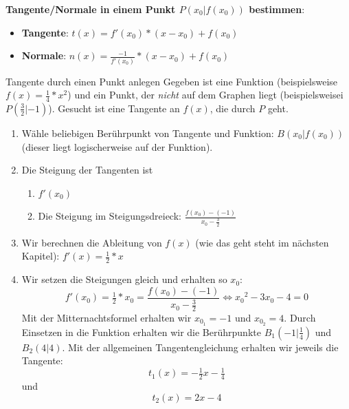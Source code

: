 \begin{koch}
  \textbf{Tangente/Normale in einem Punkt $P(x_0|f(x_0))$ bestimmen}: \\
  \begin{itemize}
    \item \textbf{Tangente}: $t(x)=f'(x_0)*(x-x_0)+f(x_0)$
    \item \textbf{Normale}: $n(x)=\frac{-1}{f'(x_0)}*(x-x_0)+f(x_0)$
  \end{itemize}
\end{koch}



\begin{bla}{Tangente durch einen Punkt anlegen}
  Gegeben ist eine Funktion (beispielsweise $f(x)=\tfrac{1}{4}*x^2$) und ein Punkt, der \emph{nicht} auf dem Graphen liegt (beispielsweisei $P(\tfrac{3}{2}|-1)$). Gesucht ist eine Tangente an $f(x)$, die durch $P$ geht.
  \begin{enumerate}
    \item Wähle beliebigen Berührpunkt von Tangente und Funktion: $B(x_0|f(x_0))$ (dieser liegt logischerweise auf der Funktion).
    \item Die Steigung der Tangenten ist
    \begin{enumerate}
      \item $f'(x_0)$
      \item Die Steigung im Steigungsdreieck: $\frac{f(x_0)-(-1)}{x_0-\tfrac{3}{2}}$
    \end{enumerate}
    \item Wir berechnen die Ableitung von $f(x)$ (wie das geht steht im nächsten Kapitel): $f'(x)=\tfrac{1}{2}*x$
    \item Wir setzen die Steigungen gleich und erhalten so $x_0$:
    \begin{equation*}
      f'(x_0)=\tfrac{1}{2}*x_0=\frac{f(x_0)-(-1)}{x_0-\tfrac{3}{2}} \Leftrightarrow {x_0}^2-3x_0-4=0
    \end{equation*}
    Mit der Mitternachtsformel erhalten wir $x_{0_1}=-1$ und $x_{0_2}=4$. Durch Einsetzen in die Funktion erhalten wir die Berührpunkte $B_1(-1|\tfrac{1}{4})$ und $B_2(4|4)$. Mit der allgemeinen Tangentengleichung erhalten wir jeweils die Tangente:
    \begin{equation*}
      t_1(x)=-\tfrac{1}{2}x- \tfrac{1}{4}
    \end{equation*}
    und
    \begin{equation*}
      t_2(x)=2x-4
    \end{equation*}
  \end{enumerate}
\end{bla}

